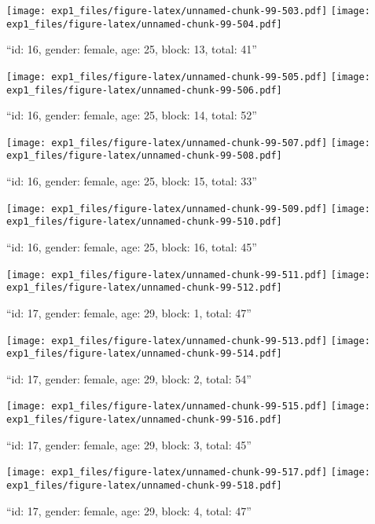 \documentclass[,]{article}
\begin{document}
\texttt{[image: exp1\_files/figure-latex/unnamed-chunk-99-503.pdf]}
\texttt{[image: exp1\_files/figure-latex/unnamed-chunk-99-504.pdf]}

\newpage
[1] 

``id: 16, gender: female, age: 25, block: 13, total: 41''

\texttt{[image: exp1\_files/figure-latex/unnamed-chunk-99-505.pdf]}
\texttt{[image: exp1\_files/figure-latex/unnamed-chunk-99-506.pdf]}

\newpage
[1] 

``id: 16, gender: female, age: 25, block: 14, total: 52''

\texttt{[image: exp1\_files/figure-latex/unnamed-chunk-99-507.pdf]}
\texttt{[image: exp1\_files/figure-latex/unnamed-chunk-99-508.pdf]}

\newpage
[1] 

``id: 16, gender: female, age: 25, block: 15, total: 33''

\texttt{[image: exp1\_files/figure-latex/unnamed-chunk-99-509.pdf]}
\texttt{[image: exp1\_files/figure-latex/unnamed-chunk-99-510.pdf]}

\newpage
[1] 

``id: 16, gender: female, age: 25, block: 16, total: 45''

\texttt{[image: exp1\_files/figure-latex/unnamed-chunk-99-511.pdf]}
\texttt{[image: exp1\_files/figure-latex/unnamed-chunk-99-512.pdf]}

\newpage
[1] 

``id: 17, gender: female, age: 29, block: 1, total: 47''

\texttt{[image: exp1\_files/figure-latex/unnamed-chunk-99-513.pdf]}
\texttt{[image: exp1\_files/figure-latex/unnamed-chunk-99-514.pdf]}

\newpage
[1] 

``id: 17, gender: female, age: 29, block: 2, total: 54''

\texttt{[image: exp1\_files/figure-latex/unnamed-chunk-99-515.pdf]}
\texttt{[image: exp1\_files/figure-latex/unnamed-chunk-99-516.pdf]}

\newpage
[1] 

``id: 17, gender: female, age: 29, block: 3, total: 45''

\texttt{[image: exp1\_files/figure-latex/unnamed-chunk-99-517.pdf]}
\texttt{[image: exp1\_files/figure-latex/unnamed-chunk-99-518.pdf]}

\newpage
[1] 

``id: 17, gender: female, age: 29, block: 4, total: 47''
\end{document}
